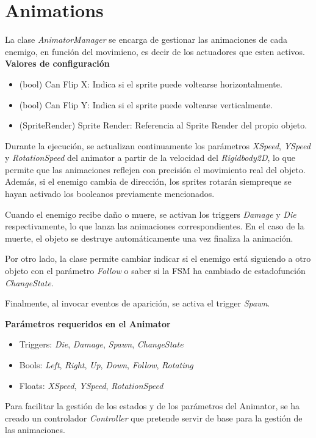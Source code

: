 \section{Animations}
La clase \textit{AnimatorManager} se encarga de gestionar las animaciones de cada enemigo, en función del movimieno, es decir de los actuadores que esten activos.\\

\textbf{Valores de configuración}
\begin{itemize}
	\item (bool) Can Flip X: Indica si el sprite puede voltearse horizontalmente.
	\item (bool) Can Flip Y: Indica si el sprite puede voltearse verticalmente. 
\item (SpriteRender) Sprite Render: Referencia al Sprite Render del propio objeto.
\end{itemize}

Durante la ejecución, se actualizan continuamente los parámetros \textit{XSpeed},  \textit{YSpeed}  y  \textit{RotationSpeed}  del animator a partir de la velocidad del \textit{Rigidbody2D}, lo que permite que las animaciones reflejen con precisión el movimiento real del objeto. Además, si el enemigo cambia de dirección, los sprites rotarán siempreque se hayan activado  los booleanos previamente mencionados.

Cuando el enemigo recibe daño o muere, se activan los triggers \textit{Damage} y \textit{Die} respectivamente, lo que lanza las animaciones correspondientes. En el caso de la muerte, el objeto se destruye automáticamente una vez finaliza la animación. 

Por otro lado, la clase permite cambiar indicar si el enemigo está siguiendo a otro objeto con el parámetro \textit{Follow} o saber si la FSM ha cambiado de estadofunción \textit{ChangeState}.

Finalmente, al invocar eventos de aparición, se activa el trigger \textit{Spawn}.

\textbf{Parámetros requeridos en el Animator}
\begin{itemize}
	\item Triggers: \textit{Die}, \textit{Damage}, \textit{Spawn}, \textit{ChangeState}
	\item Bools: \textit{Left}, \textit{Right}, \textit{Up}, \textit{Down}, \textit{Follow}, \textit{Rotating}
	\item Floats: \textit{XSpeed}, \textit{YSpeed}, \textit{RotationSpeed}
\end{itemize}
Para facilitar la gestión de los estados y de los parámetros del Animator, se ha creado un controlador  \textit{Controller} que pretende servir de base para la gestión de las animaciones.


